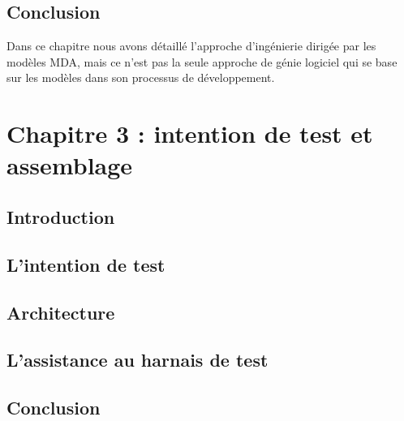 \documentclass[
10pt, %
a4paper, %
oneside, %
headinclude,footinclude, %
BCOR5mm, %
]{report}
\begin{document}
		\section{Conclusion}
		Dans ce chapitre nous avons détaillé l’approche d'ingénierie dirigée par les modèles MDA, mais ce n'est pas la seule approche de génie logiciel qui se base sur les modèles dans son processus de développement. 
										  
										  
										  
		\newpage 
		\chapter{Chapitre 3 : intention de test et assemblage}
		\minitoc  
		\section{Introduction}
		\lipsum[5] %
		\section{L'intention de test}
		\lipsum[5] %
		\section{Architecture}
		\lipsum[5] %
		\section{L'assistance au harnais de test}
		\lipsum[5] %
		\section{Conclusion}
		\lipsum[10]	
										  
										  
\end{document}
